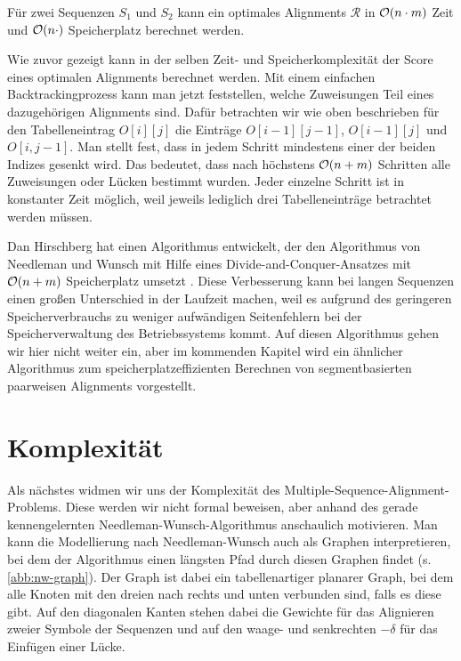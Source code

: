\begin{korollar}
	Für zwei Sequenzen $S_1$ und $S_2$ kann ein optimales Alignments $\mathcal{R}$ in $\mathcal{O}(n\cdot m)$ Zeit und $\mathcal{O}(n\cdot)$ Speicherplatz berechnet werden.
\end{korollar}

\begin{beweis}
	Wie zuvor gezeigt kann in der selben Zeit- und Speicherkomplexität der Score eines optimalen Alignments berechnet werden. Mit einem einfachen Backtrackingprozess kann man jetzt feststellen, welche Zuweisungen Teil eines dazugehörigen Alignments sind. Dafür betrachten wir wie oben beschrieben für den Tabelleneintrag $O[i][j]$ die Einträge  $O[i-1][j-1]$, $O[i-1][j]$ und $O[i,j-1]$. Man stellt fest, dass in jedem Schritt mindestens einer der beiden Indizes gesenkt wird. Das bedeutet, dass nach höchstens $\mathcal{O}(n+m)$ Schritten alle Zuweisungen oder Lücken bestimmt wurden. Jeder einzelne Schritt ist in konstanter Zeit möglich, weil jeweils lediglich drei Tabelleneinträge betrachtet werden müssen. 
\end{beweis}

Dan Hirschberg hat einen Algorithmus entwickelt, der den Algorithmus von Needleman und Wunsch mit Hilfe eines Divide-and-Conquer-Ansatzes mit $\mathcal{O}(n+m)$ Speicherplatz umsetzt \cite{h75}. Diese Verbesserung kann bei langen Sequenzen einen großen Unterschied in der Laufzeit machen, weil es aufgrund des geringeren Speicherverbrauchs zu weniger aufwändigen Seitenfehlern bei der Speicherverwaltung des Betriebssystems kommt. Auf diesen Algorithmus gehen wir hier nicht weiter ein, aber im kommenden Kapitel wird ein ähnlicher Algorithmus zum speicherplatzeffizienten Berechnen von segmentbasierten paarweisen Alignments vorgestellt.

\section{Komplexität}

Als nächstes widmen wir uns der Komplexität des Multiple-Sequence-Alignment-Problems. Diese werden wir nicht formal beweisen, aber anhand des gerade kennengelernten Needleman-Wunsch-Algorithmus anschaulich motivieren. Man kann die Modellierung nach Needleman-Wunsch auch als Graphen interpretieren, bei dem der Algorithmus einen längsten Pfad durch diesen Graphen findet (s. \ref{abb:nw-graph}). Der Graph ist dabei ein tabellenartiger planarer Graph, bei dem alle Knoten mit den dreien nach rechts und unten verbunden sind, falls es diese gibt. Auf den diagonalen Kanten stehen dabei die Gewichte für das Alignieren zweier Symbole der Sequenzen und auf den waage- und senkrechten $-\delta$ für das Einfügen einer Lücke.

